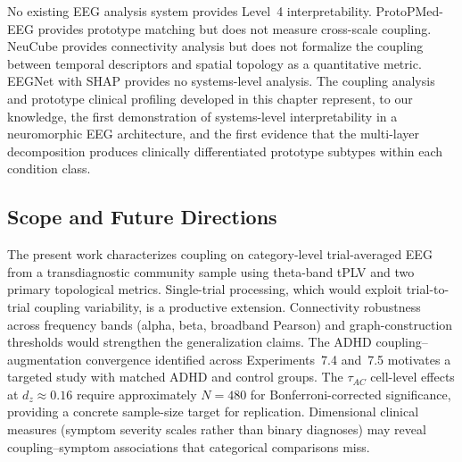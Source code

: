 No existing EEG analysis system provides Level~4 interpretability. ProtoPMed-EEG \cite{barnett_protopmed_2024} provides prototype matching but does not measure cross-scale coupling. NeuCube \cite{kasabov_neucube_2014} provides connectivity analysis but does not formalize the coupling between temporal descriptors and spatial topology as a quantitative metric. EEGNet with SHAP provides no systems-level analysis. The coupling analysis and prototype clinical profiling developed in this chapter represent, to our knowledge, the first demonstration of systems-level interpretability in a neuromorphic EEG architecture, and the first evidence that the multi-layer decomposition produces clinically differentiated prototype subtypes within each condition class.

\subsection{Scope and Future Directions}

The present work characterizes coupling on category-level trial-averaged EEG from a transdiagnostic community sample using theta-band tPLV and two primary topological metrics. Single-trial processing, which would exploit trial-to-trial coupling variability, is a productive extension. Connectivity robustness across frequency bands (alpha, beta, broadband Pearson) and graph-construction thresholds would strengthen the generalization claims. The ADHD coupling--augmentation convergence identified across Experiments~7.4 and~7.5 motivates a targeted study with matched ADHD and control groups. The $\tau_{AC}$ cell-level effects at $d_z \approx 0.16$ require approximately $N = 480$ for Bonferroni-corrected significance, providing a concrete sample-size target for replication. Dimensional clinical measures (symptom severity scales rather than binary diagnoses) may reveal coupling--symptom associations that categorical comparisons miss.